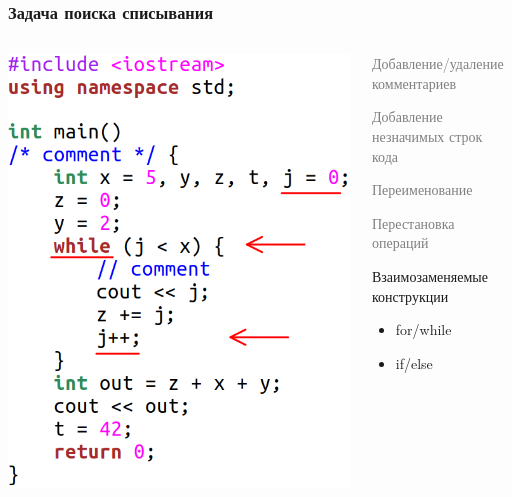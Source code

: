 \documentclass[10pt]{beamer}
\begin{document}
\begin{frame}[fragile]\frametitle{Задача поиска списывания}
	\begin{columns}[T]
		\centering
		\includegraphics[scale=0.7]{control.png}
		
		\centering
		\begin{itemize}
			\item \textcolor{gray}{Добавление/удаление комментариев
				\item Добавление незначимых строк кода
				\item Переименование
			\item Перестановка операций}
				\item Взаимозаменяемые конструкции
			\begin{itemize}
				\item for/while
					\item if/else
			\end{itemize}
		\end{itemize}
	\end{columns}
\end{frame}
\end{document}
